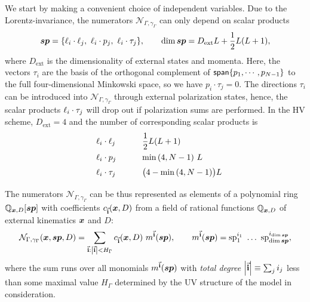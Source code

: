 We start by making a convenient choice of independent variables.
Due to the Lorentz-invariance, the numerators $\mathcal{N}_{\Gamma,\gamma_\Gamma}$ can only depend on scalar products
\begin{equation}
  \label{eq:sps_all}
  \vb*{sp} = \{ \sp(\ell_i,\ell_j),~\sp(\ell_i,p_j),~\sp(\ell_i, \tau_j) \}, \qquad \dim{\vb*{sp}} = D_{\text{ext}} L + \frac{1}{2}L(L+1),
\end{equation}
where $D_{\text{ext}}$ is the dimensionality of external states and momenta.
Here, the vectors $\tau_i$ are the basis of the orthogonal complement of $\mathsf{span}\{p_1,\cdots,p_{N-1}\}$ to the full four-dimensional Minkowski space,
so we have $p_i \cdot \tau_j = 0$.
The directions $\tau_i$ can be introduced into $\mathcal{N}_{\Gamma,\gamma_\Gamma}$ through external polarization states, hence,
the scalar products $\sp(\ell_i, \tau_j)$ will drop out if polarization sums are performed.
In the HV scheme, $D_{\text{ext}}=4$ and the number of corresponding scalar products is
\begin{equation}
  \label{eq:sp_counts}
  \renewcommand{\arraystretch}{1.5}
  \begin{tabular}[h]{p{10ex} p{20ex}}
       $\sp(\ell_i,\ell_j)$  &   $\dfrac{1}{2}L(L+1)$                \\
        $\sp(\ell_i,p_j)$    &   $\min\qty(4,N-1) ~L$                  \\
       $\sp(\ell_i, \tau_j)$ &   $ \qty\big(4-\min\qty(4,N-1)) L $  \\
  \end{tabular}
\end{equation}

The numerators $\mathcal{N}_{\Gamma,\gamma_\Gamma}$ can be thus represented as elements of a polynomial ring
$\mathbb{Q}_{\vb*{x},D}[\vb*{sp}]$ 
with coefficients $c_{\va{i}}(\vb*{x},D)$ from a field of rational functions $\mathbb{Q}_{\vb*{x},D}$ of external kinematics $\vb*{x}$ and $D$:
\begin{equation}
  \mathcal{N}_{\Gamma,\gamma_\Gamma}(\vb*{x}, \vb*{sp}, D) = \sum_{\va{i} : \abs{\va{i}} < H_{\Gamma}} c_{\va{i}} (\vb*{x},D)~ m^{\va{i}}(\vb*{sp}),
  \qquad m^{\va{i}}(\vb*{sp}) = \mathrm{sp}_1^{i_1} ~\ldots{}~ \mathrm{sp}_{\dim{\vb*{sp}}}^{i_{\dim{\vb*{sp}}}},
\end{equation}
where the sum runs over all monomials $m^{\va{i}}(\vb*{sp})$ with \emph{total degree} $\abs{\va{i}} \equiv \sum_j i_j$ less than
some maximal value $ H_{\Gamma} $ determined by the UV structure of the model in consideration.


